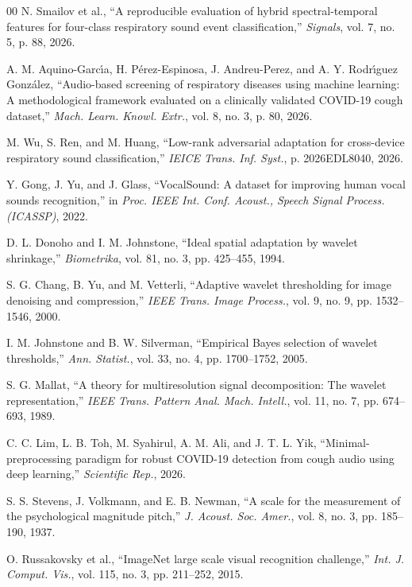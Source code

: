 \begin{thebibliography}{00}
N. Smailov et al., ``A reproducible evaluation of hybrid spectral-temporal features for four-class respiratory sound event classification,'' \emph{Signals}, vol. 7, no. 5, p. 88, 2026.

A. M. Aquino-Garc{\'\i}a, H. P{\'e}rez-Espinosa, J. Andreu-Perez, and A. Y. Rodr{\'\i}guez Gonz{\'a}lez, ``Audio-based screening of respiratory diseases using machine learning: A methodological framework evaluated on a clinically validated COVID-19 cough dataset,'' \emph{Mach. Learn. Knowl. Extr.}, vol. 8, no. 3, p. 80, 2026.

M. Wu, S. Ren, and M. Huang, ``Low-rank adversarial adaptation for cross-device respiratory sound classification,'' \emph{IEICE Trans. Inf. Syst.}, p. 2026EDL8040, 2026.

Y. Gong, J. Yu, and J. Glass, ``VocalSound: A dataset for improving human vocal sounds recognition,'' in \emph{Proc. IEEE Int. Conf. Acoust., Speech Signal Process. (ICASSP)}, 2022.

D. L. Donoho and I. M. Johnstone, ``Ideal spatial adaptation by wavelet shrinkage,'' \emph{Biometrika}, vol. 81, no. 3, pp. 425--455, 1994.

S. G. Chang, B. Yu, and M. Vetterli, ``Adaptive wavelet thresholding for image denoising and compression,'' \emph{IEEE Trans. Image Process.}, vol. 9, no. 9, pp. 1532--1546, 2000.

I. M. Johnstone and B. W. Silverman, ``Empirical Bayes selection of wavelet thresholds,'' \emph{Ann. Statist.}, vol. 33, no. 4, pp. 1700--1752, 2005.

S. G. Mallat, ``A theory for multiresolution signal decomposition: The wavelet representation,'' \emph{IEEE Trans. Pattern Anal. Mach. Intell.}, vol. 11, no. 7, pp. 674--693, 1989.

C. C. Lim, L. B. Toh, M. Syahirul, A. M. Ali, and J. T. L. Yik, ``Minimal-preprocessing paradigm for robust COVID-19 detection from cough audio using deep learning,'' \emph{Scientific Rep.}, 2026.

S. S. Stevens, J. Volkmann, and E. B. Newman, ``A scale for the measurement of the psychological magnitude pitch,'' \emph{J. Acoust. Soc. Amer.}, vol. 8, no. 3, pp. 185--190, 1937.

O. Russakovsky et al., ``ImageNet large scale visual recognition challenge,'' \emph{Int. J. Comput. Vis.}, vol. 115, no. 3, pp. 211--252, 2015.


\end{thebibliography}
